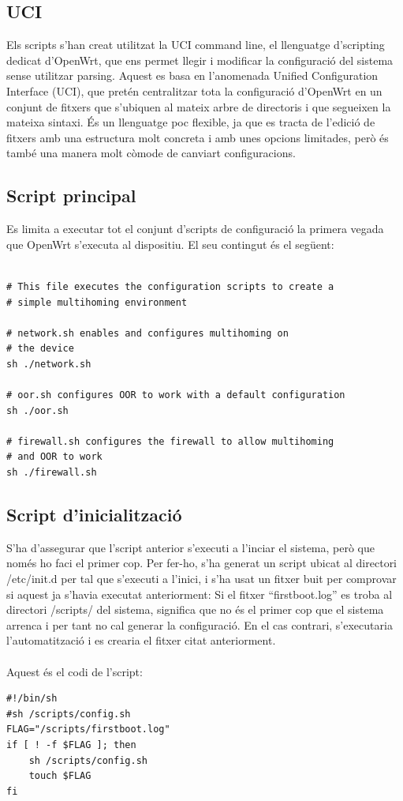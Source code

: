 \documentclass[11pt]{article}
\begin{document}
\subsection{UCI}
Els scripts s’han creat utilitzat la UCI command line, el llenguatge d’scripting dedicat d’OpenWrt, que ens permet llegir i modificar la configuració del sistema sense utilitzar parsing. Aquest es basa en l’anomenada Unified Configuration Interface (UCI), que pretén centralitzar tota la configuració d’OpenWrt en un conjunt de fitxers que s’ubiquen al mateix arbre de directoris i que segueixen la mateixa sintaxi. És un llenguatge poc flexible, ja que es tracta de l’edició de fitxers amb una estructura molt concreta i amb unes opcions limitades, però és també una manera molt còmode de canviart configuracions.
\subsection{Script principal}
Es limita a executar tot el conjunt d’scripts de configuració la primera vegada que OpenWrt s’executa al dispositiu. El seu contingut és el següent:\\
\lstset{language=sh}
\begin{lstlisting}[frame=single]

# This file executes the configuration scripts to create a
# simple multihoming environment

# network.sh enables and configures multihoming on 
# the device
sh ./network.sh

# oor.sh configures OOR to work with a default configuration
sh ./oor.sh

# firewall.sh configures the firewall to allow multihoming 
# and OOR to work
sh ./firewall.sh
\end{lstlisting}

\subsection{Script d’inicialització}
S’ha d’assegurar que l’script anterior s’executi a l’inciar el sistema, però que només ho faci el primer cop. Per fer-ho, s’ha generat un script ubicat al directori /etc/init.d per tal que s’executi a l’inici, i s’ha usat un fitxer buit per comprovar si aquest ja s’havia executat anteriorment: Si el fitxer “firstboot.log” es troba al directori /scripts/ del sistema, significa que no és el primer cop que el sistema arrenca i per tant no cal generar la configuració. En el cas contrari, s’executaria l’automatització i es crearia el fitxer citat anteriorment.\\
\\
Aquest és el codi de l’script:\\
\lstset{language=sh}
\begin{lstlisting}[frame=single]
#!/bin/sh
#sh /scripts/config.sh
FLAG="/scripts/firstboot.log"
if [ ! -f $FLAG ]; then
    sh /scripts/config.sh
    touch $FLAG
fi
\end{lstlisting}
\end{document}
